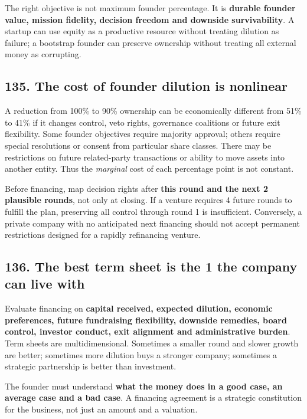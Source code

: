 The right objective is not maximum founder percentage. It is \textbf{durable founder value, mission fidelity, decision freedom and downside survivability}. A startup can use equity as a productive resource without treating dilution as failure; a bootstrap founder can preserve ownership without treating all external money as corrupting.

\subsection{135. The cost of founder dilution is nonlinear}


A reduction from 100\% to 90\% ownership can be economically different from 51\% to 41\% if it changes control, veto rights, governance coalitions or future exit flexibility. Some founder objectives require majority approval; others require special resolutions or consent from particular share classes. There may be restrictions on future related-party transactions or ability to move assets into another entity. Thus the \textit{marginal} cost of each percentage point is not constant.

Before financing, map decision rights after \textbf{this round and the next 2 plausible rounds}, not only at closing. If a venture requires 4 future rounds to fulfill the plan, preserving all control through round 1 is insufficient. Conversely, a private company with no anticipated next financing should not accept permanent restrictions designed for a rapidly refinancing venture.

\subsection{136. The best term sheet is the 1 the company can live with}


Evaluate financing on \textbf{capital received, expected dilution, economic preferences, future fundraising flexibility, downside remedies, board control, investor conduct, exit alignment and administrative burden}. Term sheets are multidimensional. Sometimes a smaller round and slower growth are better; sometimes more dilution buys a stronger company; sometimes a strategic partnership is better than investment.

The founder must understand \textbf{what the money does in a good case, an average case and a bad case}. A financing agreement is a strategic constitution for the business, not just an amount and a valuation.

